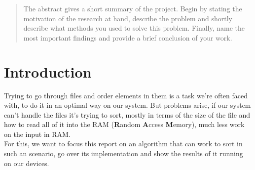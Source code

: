 \documentclass[twocolumn]{article}
\begin{document}


\begin{abstract}
    The abstract gives a short summary of the project. Begin by stating the motivation of the research at hand, describe the problem and shortly describe what methods you used to solve this problem. Finally, name the most important findings and provide a brief conclusion of your work.
\end{abstract}


\section{Introduction}
Trying to go through files and order elements in them is a task we're often faced with, to do it in an optimal way on our system. But problems arise, if our system can't handle the files it's trying to sort, mostly in terms of the size of the file and how to read all of it into the RAM (\textbf{R}andom \textbf{A}ccess \textbf{M}emory), much less work on the input in RAM.\\
For this, we want to focus this report on an algorithm that can work to sort in such an scenario, go over its implementation and show the results of it running on our devices.
\end{document}
